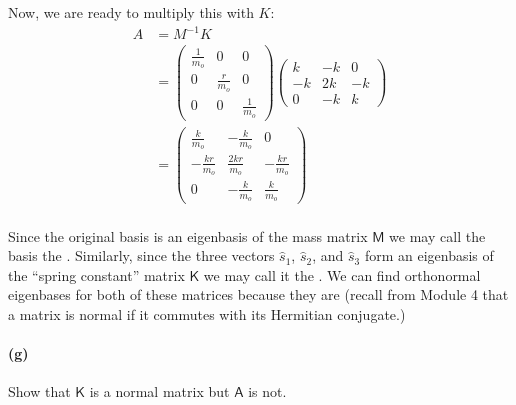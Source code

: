 \documentclass{article}
\begin{document}
\begin{solution}
\[	\] 
	Now, we are ready to multiply this with $K$:
	\begin{align*}
		A &=  M^{-1}K \\
		  &= \begin{pmatrix} \frac{1}{m_o} & 0 &0\\ 0 & \frac{r}{m_o} & 0 \\ 0 & 0 & \frac{1}{m_o} \end{pmatrix} \begin{pmatrix} k & -k & 0\\ -k & 2k & -k\\ 0 & -k & k \end{pmatrix}  \\
		  &= \begin{pmatrix} \frac{k}{m_o} & -\frac{k}{m_o} & 0\\ -\frac{kr}{m_o} & \frac{2kr}{m_o} & -\frac{kr}{m_o}\\ 0 & -\frac{k}{m_o} & \frac{k}{m_o} \end{pmatrix}
	\end{align*}
\end{solution}



\phline
\paragraph{}
Since the original basis is an eigenbasis of the mass matrix $\mathsf{M}$ we may call the basis the .  Similarly, since the three vectors 
$\hat{s}_{1}$, $\hat{s}_{2}$, and $\hat{s}_{3}$ form an eigenbasis of the ``spring constant'' matrix $\mathsf{K}$ we may call it the .
We can find orthonormal eigenbases for both of these matrices because they are  (recall from Module 4 that a matrix is normal if it
commutes with its Hermitian conjugate.)

\paragraph{(g)}
Show that $\mathsf{K}$ is a normal matrix but $\mathsf{A}$ is not.
\end{document}

